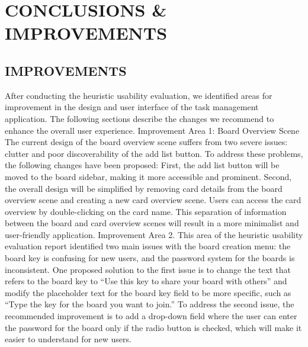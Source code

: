 \section{CONCLUSIONS \& IMPROVEMENTS}
\subsection{IMPROVEMENTS}
After conducting the heuristic usability evaluation, we identified areas for improvement in the design and user interface of the task management application. The following sections describe the changes we recommend to enhance the overall user experience.
\newline
Improvement Area 1: Board Overview Scene
\newline
\indent The current design of the board overview scene suffers from two severe issues: clutter and poor discoverability of the add list button. To address these problems, the following changes have been proposed:
\newline
\indent First, the add list button will be moved to the board sidebar, making it more accessible and prominent.
\newline 
Second, the overall design will be simplified by removing card details from the board overview scene and creating a new card overview scene. Users can access the card overview by double-clicking on the card name. This separation of information between the board and card overview scenes will result in a more minimalist and user-friendly application.
\newline
\newline
Improvement Area 2.
\indent This area of the heuristic usability evaluation report identified two main issues with the board creation menu: the board key is confusing for new users, and the password system for the boards is inconsistent. 
\newline
\indent One proposed solution to the first issue is to change the text that refers to the board key to “Use this key to share your board with others” and modify the placeholder text for the board key field to be more specific, such as “Type the key for the board you want to join.” 
\newline
\indent To address the second issue, the recommended improvement is to add a drop-down field where the user can enter the password for the board only if the radio button is checked, which will make it easier to understand for new users.
\newline
\newline
